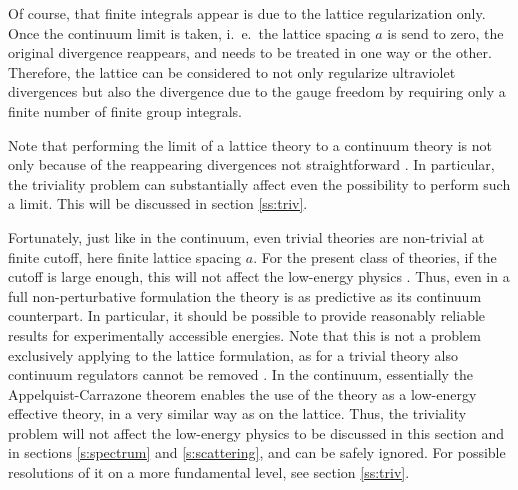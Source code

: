 \documentclass[final,12pt]{article}
\newcommand*{\1}{1\!\!\!\bot}
\begin{document}
Of course, that finite integrals appear is due to the lattice regularization only. Once the continuum limit is taken, i.\ e.\ the lattice spacing $a$ is send to zero, the original divergence reappears, and needs to be treated in one way or the other. Therefore, the lattice can be considered to not only regularize ultraviolet divergences but also the divergence due to the gauge freedom by requiring only a finite number of finite group integrals.

Note that performing the limit of a lattice theory to a continuum theory is not only because of the reappearing divergences not straightforward \cite{Montvay:1994cy,Gattringer:2010zz,DeGrand:2006zz}. In particular, the triviality problem \cite{Callaway:1988ya} can substantially affect even the possibility to perform such a limit. This will be discussed in section \ref{ss:triv}.

Fortunately, just like in the continuum, even trivial theories are non-trivial at finite cutoff, here finite lattice spacing $a$. For the present class of theories, if the cutoff is large enough, this will not affect the low-energy physics \cite{Hasenfratz:1986za,Kuti:1987nr}. Thus, even in a full non-perturbative formulation the theory is as predictive as its continuum counterpart. In particular, it should be possible to provide reasonably reliable results for experimentally accessible energies. Note that this is not a problem exclusively applying to the lattice formulation, as for a trivial theory also continuum regulators cannot be removed \cite{Callaway:1988ya}. In the continuum, essentially the Appelquist-Carrazone theorem \cite{Bohm:2001yx} enables the use of the theory as a low-energy effective theory, in a very similar way as on the lattice. Thus, the triviality problem will not affect the low-energy physics to be discussed in this section and in sections \ref{s:spectrum} and \ref{s:scattering}, and can be safely ignored. For possible resolutions of it on a more fundamental level, see section \ref{ss:triv}.
\end{document}
